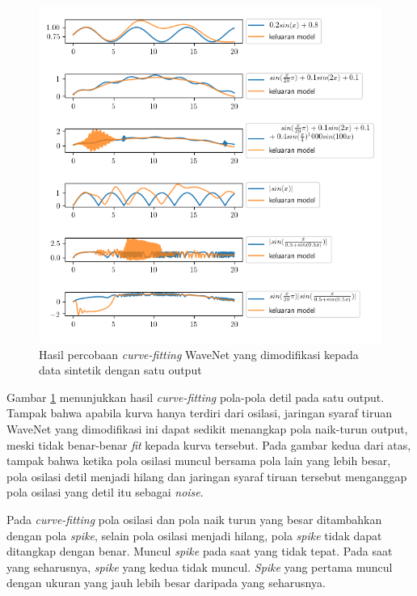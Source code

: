 \begin{figure}[htbp]
    \centering
    \includegraphics[width=\textwidth]{resources/analisis_modified_wavenet.png}
    \caption{Hasil percobaan \textit{curve-fitting} WaveNet yang dimodifikasi kepada data sintetik dengan satu output}\label{fig-curvefit-modified-wavenet}
\end{figure}

Gambar \ref{fig-curvefit-modified-wavenet} menunjukkan hasil \textit{curve-fitting} pola-pola detil pada satu output. Tampak bahwa apabila kurva hanya terdiri dari osilasi, jaringan syaraf tiruan WaveNet yang dimodifikasi ini dapat sedikit menangkap pola naik-turun output, meski tidak benar-benar \textit{fit} kepada kurva tersebut. Pada gambar kedua dari atas, tampak bahwa ketika pola osilasi muncul bersama pola lain yang lebih besar, pola osilasi detil menjadi hilang dan jaringan syaraf tiruan tersebut menganggap pola osilasi yang detil itu sebagai \textit{noise}.

Pada \textit{curve-fitting} pola osilasi dan pola naik turun yang besar ditambahkan dengan pola \textit{spike}, selain pola osilasi menjadi hilang, pola \textit{spike} tidak dapat ditangkap dengan benar. Muncul \textit{spike} pada saat yang tidak tepat. Pada saat yang seharusnya, \textit{spike} yang kedua tidak muncul. \textit{Spike} yang pertama muncul dengan ukuran yang jauh lebih besar daripada yang seharusnya.

